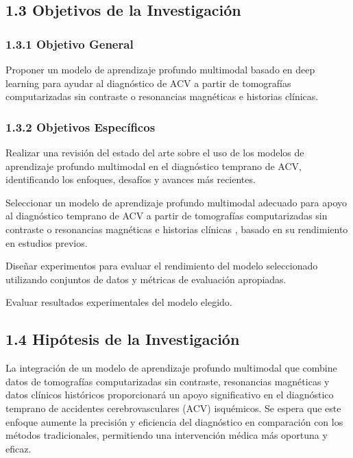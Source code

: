 \subsection{1.3 Objetivos de la Investigación}

\subsubsection{1.3.1 Objetivo General}
Proponer un modelo de aprendizaje profundo multimodal basado en deep learning para ayudar al diagnóstico de ACV a partir de tomografías computarizadas sin contraste  o resonancias magnéticas e historias clínicas.

\subsubsection{1.3.2 Objetivos Específicos}
\begin{APAenumerate}
    \item Realizar una revisión del estado del arte sobre el uso de los modelos de aprendizaje profundo multimodal en el diagnóstico temprano de ACV, identificando los enfoques, desafíos y avances más recientes.
     \item Seleccionar un modelo de aprendizaje profundo multimodal adecuado para apoyo al diagnóstico temprano de ACV a partir de tomografías computarizadas sin contraste o resonancias magnéticas e historias clínicas , basado en su rendimiento en estudios previos.    
     \item Diseñar experimentos para evaluar el rendimiento del modelo seleccionado utilizando conjuntos de datos y métricas de evaluación apropiadas.
    \item Evaluar resultados experimentales del modelo elegido.

\end{APAenumerate}
  
\subsection{1.4 Hipótesis de la Investigación}
\begin{APAenumerate}
La integración de un modelo de aprendizaje profundo multimodal que combine datos de tomografías computarizadas sin contraste, resonancias magnéticas y datos clínicos históricos proporcionará un apoyo significativo en el diagnóstico temprano de accidentes cerebrovasculares (ACV) isquémicos. Se espera que este enfoque aumente la precisión y eficiencia del diagnóstico en comparación con los métodos tradicionales, permitiendo una intervención médica más oportuna y eficaz. 
\end{APAenumerate}

